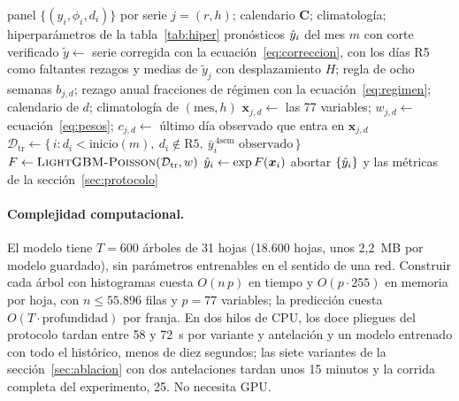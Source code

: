 \begin{algorithm}[t]
  \caption{Entrenamiento y pronóstico del modelo propuesto para el pliegue $m$ con antelación $H$.}
  \label{alg:modelo}
  \begin{algorithmic}[1]
    \Require panel $\{(y_i, \phi_i, d_i)\}$ por serie $j = (r,h)$; calendario $\bm{C}$; climatología; hiperparámetros de la tabla~\ref{tab:hiper}
    \Ensure pronósticos $\hat{y}_i$ del mes $m$ con corte verificado
    \State $\tilde{y} \gets$ serie corregida con la ecuación~\eqref{eq:correccion}, con los días R5 como faltantes
      \State rezagos y medias de $\tilde{y}_j$ con desplazamiento $H$; regla de ocho semanas $b_{j,d}$; rezago anual
      \State fracciones de régimen con la ecuación~\eqref{eq:regimen}; calendario de $d$; climatología de $(\text{mes}, h)$
      \State $\bm{x}_{j,d} \gets$ las 77 variables; $w_{j,d} \gets$ ecuación~\eqref{eq:pesos}; $c_{j,d} \gets$ último día observado que entra en $\bm{x}_{j,d}$
    \EndFor
    \State $\mathcal{D}_{\mathrm{tr}} \gets \{\, i : d_i < \text{inicio}(m),\ d_i \notin \text{R5},\ \bar{y}^{\,4\text{sem}}_i \text{ observado} \,\}$ 
    \State $F \gets \textsc{LightGBM-Poisson}(\mathcal{D}_{\mathrm{tr}}, w)$ 
      \State $\hat{y}_i \gets \exp F(\bm{x}_i)$
       \State abortar  \EndIf
    \EndFor
    \State \Return $\{\hat{y}_i\}$ y las métricas de la sección~\ref{sec:protocolo}
  \end{algorithmic}
\end{algorithm}

\paragraph{Complejidad computacional.}
El modelo tiene $T = 600$ árboles de 31 hojas (18.600 hojas, unos 2,2~MB por modelo guardado), sin
parámetros entrenables en el sentido de una red. Construir cada árbol con histogramas cuesta
$O(n\,p)$ en tiempo y $O(p \cdot 255)$ en memoria por hoja, con $n \leq 55.896$ filas y $p = 77$ variables;
la predicción cuesta $O(T \cdot \text{profundidad})$ por franja. En dos hilos de CPU, los doce pliegues del
protocolo tardan entre 58 y 72~s por variante y antelación y un modelo entrenado con todo el histórico,
menos de diez segundos; las siete variantes de la sección~\ref{sec:ablacion} con dos antelaciones tardan
unos 15 minutos y la corrida completa del experimento, 25. No necesita GPU.

